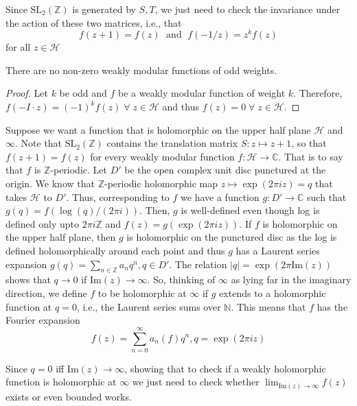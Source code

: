 \documentclass[oneside, 12pt]{scrbook}
\newcommand{\CC}{\mathbb C}
\newcommand{\NN}{\mathbb N}
\newcommand{\ZZ}{\mathbb Z}
\newcommand{\SL}{\mathrm{SL}}
\newcommand{\iM}{\mathrm{Im}}
\newcommand{\Hh}{\mathcal{H}}
\theoremstyle{theorem}
\begin{document}
\begin{remark}
Since $\SL_{2}(\ZZ)$ is generated by $S,T$, we just need to check the invariance under the action of these two matrices, i.e., that $$f(z +1)=f(z) \; \text{ and } \; f(-1/z) = z^k f(z)$$ for all $z \in \Hh$
\end{remark}

\begin{lemma}
There are no non-zero weakly modular functions of odd weights.
\end{lemma}

\begin{proof}
Let $k$ be odd and $f$ be a weakly modular function of weight $k$. Therefore, $f(-I \cdot z)=(-1)^k f(z) \; \forall \; z\in \Hh$ and thus $f(z)=0 \; \forall \;z \in \Hh$.
\end{proof}

\begin{remark}
Suppose we want a function that is holomorphic on the upper half plane $\Hh$ and $\infty$. Note that $\SL_{2}(\ZZ)$ contains the translation matrix $S : z \mapsto z+1$, so that $f(z+1)=f(z)$ for every weakly modular function $f: \Hh \rightarrow \CC$. That is to say that $f$ is $\ZZ$-periodic. Let $D'$ be the open complex unit disc punctured at the origin. We know that $\ZZ$-periodic holomorphic map $z \mapsto \exp(2\pi i z) = q$ that takes $\Hh$ to $D'$. Thus, corresponding to $f$ we have a function $g: D' \rightarrow \CC$ such that $g(q) = f(\log (q)/ (2 \pi i))$. Then, $g$ is well-defined even though log is defined only upto $2 \pi i \ZZ$ and $f(z)=g(\exp(2 \pi iz))$. If $f$ is holomorphic on the upper half plane, then $g$ is holomorphic on the punctured disc as the log is defined holomorphically around each point and thus $g$ has a Laurent series expansion $g(q) = \sum_{n \in \ZZ} a_{n} q^n , q \in D'$. The relation $|q| = \exp(2 \pi \iM(z))$ shows that $q \rightarrow 0$ if $\iM(z) \rightarrow \infty$. So, thinking of $\infty$ as lying far in the imaginary direction, we define $f$ to be holomorphic at $\infty$ if $g$ extends to a holomorphic function at $q=0$, i.e., the Laurent series sums over $\NN$. This means that $f$ has the Fourier expansion $$f(z) = \sum_{n=0}^{\infty} a_{n}(f)q^n , q = \exp(2 \pi i z)$$

Since $q=0$ iff $\iM(z) \rightarrow \infty$, showing that to check if a weakly holomorphic function is holomorphic at $\infty$ we just need to check whether $\lim_{\iM(z) \rightarrow \infty} f(z)$ exists or even bounded works. 
\end{remark}
\end{document}

